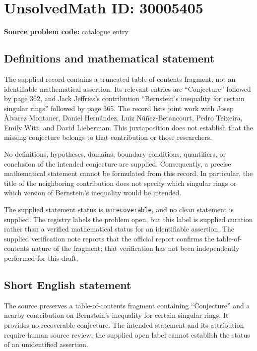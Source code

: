 \documentclass[11pt]{article}
\begin{document}
\section*{UnsolvedMath ID: 30005405}
\textbf{Source problem code:} catalogue entry
\subsection{Definitions and mathematical statement}
The supplied record contains a truncated table-of-contents fragment, not an identifiable mathematical assertion. Its relevant entries are ``Conjecture'' followed by page 362, and Jack Jeffries's contribution ``Bernstein’s inequality for certain singular rings'' followed by page 365. The record lists joint work with Josep Àlvarez Montaner, Daniel Hernández, Luiz Núñez-Betancourt, Pedro Teixeira, Emily Witt, and David Lieberman. This juxtaposition does not establish that the missing conjecture belongs to that contribution or those researchers.

No definitions, hypotheses, domains, boundary conditions, quantifiers, or conclusion of the intended conjecture are supplied. Consequently, a precise mathematical statement cannot be formulated from this record. In particular, the title of the neighboring contribution does not specify which singular rings or which version of Bernstein’s inequality would be intended.

The supplied statement status is \texttt{unrecoverable}, and no clean statement is supplied. The registry labels the problem open, but this label is supplied curation rather than a verified mathematical status for an identifiable assertion. The supplied verification note reports that the official report confirms the table-of-contents nature of the fragment; that verification has not been independently performed for this draft.
\subsection{Short English statement}
The source preserves a table-of-contents fragment containing ``Conjecture'' and a nearby contribution on Bernstein’s inequality for certain singular rings. It provides no recoverable conjecture. The intended statement and its attribution require human source review; the supplied open label cannot establish the status of an unidentified assertion.
\end{document}
